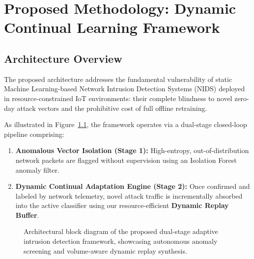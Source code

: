 \chapter{Proposed Methodology: Dynamic Continual Learning Framework}
\label{chap:proposed_framework}

\section{Architecture Overview}
The proposed architecture addresses the fundamental vulnerability of static Machine Learning-based Network Intrusion Detection Systems (NIDS) deployed in resource-constrained IoT environments: their complete blindness to novel zero-day attack vectors and the prohibitive cost of full offline retraining. 

As illustrated in Figure~\ref{fig:framework_architecture}, the framework operates via a dual-stage closed-loop pipeline comprising:
\begin{enumerate}
    \item \textbf{Anomalous Vector Isolation (Stage 1):} High-entropy, out-of-distribution network packets are flagged without supervision using an Isolation Forest anomaly filter.
    \item \textbf{Dynamic Continual Adaptation Engine (Stage 2):} Once confirmed and labeled by network telemetry, novel attack traffic is incrementally absorbed into the active classifier using our resource-efficient \textbf{Dynamic Replay Buffer}.
\end{enumerate}

\begin{figure}[htbp]
\centering
{}
\caption{Architectural block diagram of the proposed dual-stage adaptive intrusion detection framework, showcasing autonomous anomaly screening and volume-aware dynamic replay synthesis.}
\label{fig:framework_architecture}
\end{figure}


